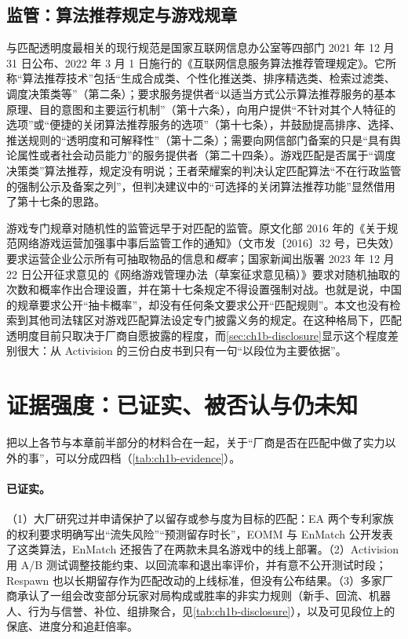 \subsection{监管：算法推荐规定与游戏规章}

与匹配透明度最相关的现行规范是国家互联网信息办公室等四部门 2021 年 12 月 31 日公布、2022 年 3 月 1 日施行的《互联网信息服务算法推荐管理规定》\cite{cac2021algorithm}\tagOff。它所称“算法推荐技术”包括“生成合成类、个性化推送类、排序精选类、检索过滤类、调度决策类等”（第二条）；要求服务提供者“以适当方式公示算法推荐服务的基本原理、目的意图和主要运行机制”（第十六条），向用户提供“不针对其个人特征的选项”或“便捷的关闭算法推荐服务的选项”（第十七条），并鼓励提高排序、选择、推送规则的“透明度和可解释性”（第十二条）；需要向网信部门备案的只是“具有舆论属性或者社会动员能力”的服务提供者（第二十四条）\tagOff。游戏匹配是否属于“调度决策类”算法推荐，规定没有明说；王者荣耀案的判决认定匹配算法“不在行政监管的强制公示及备案之列”，但判决建议中的“可选择的关闭算法推荐功能”显然借用了第十七条的思路。

游戏专门规章对随机性的监管远早于对匹配的监管。原文化部 2016 年的《关于规范网络游戏运营加强事中事后监管工作的通知》（文市发〔2016〕32 号，已失效）要求运营企业公示所有可抽取物品的信息和\emph{概率}；国家新闻出版署 2023 年 12 月 22 日公开征求意见的《网络游戏管理办法（草案征求意见稿）》要求对随机抽取的次数和概率作出合理设置，并在第十七条规定不得设置强制对战\cite{cai2023game}\tagOff{}。也就是说，中国的规章要求公开“抽卡概率”，却没有任何条文要求公开“匹配规则”。本文也没有检索到其他司法辖区对游戏匹配算法设定专门披露义务的规定。在这种格局下，匹配透明度目前只取决于厂商自愿披露的程度，而\cref{sec:ch1b-disclosure}显示这个程度差别很大：从 Activision 的三份白皮书到只有一句“以段位为主要依据”。

\section{证据强度：已证实、被否认与仍未知}
\label{sec:ch1b-evidence}

把以上各节与本章前半部分的材料合在一起，关于“厂商是否在匹配中做了实力以外的事”，可以分成四档（\cref{tab:ch1b-evidence}）。

\paragraph{已证实。}
（1）大厂研究过并申请保护了以留存或参与度为目标的匹配：EA 两个专利家族的权利要求明确写出“流失风险”“预测留存时长”\tagPat，EOMM 与 EnMatch 公开发表了这类算法，EnMatch 还报告了在两款未具名游戏中的线上部署\tagLit。（2）Activision 用 A/B 测试调整技能约束、以回流率和退出率评价，并有意不公开测试时段\tagOff；Respawn 也以长期留存作为匹配改动的上线标准，但没有公布结果\tagOff。（3）多家厂商承认了一组会改变部分玩家对局构成或胜率的非实力规则（新手、回流、机器人、行为与信誉、补位、组排聚合，见\cref{tab:ch1b-disclosure}），以及可见段位上的保底、进度分和追赶倍率\tagOff。

